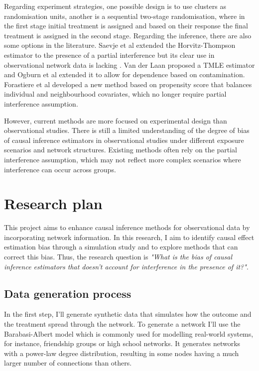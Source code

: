 \documentclass[a4paper,11pt]{article}
\begin{document}
Regarding experiment strategies, one possible design is to use clusters as randomisation units, another is a sequential two-stage randomisation, where in the first stage initial treatment is assigned and based on their response the final treatment is assigned in the second stage. Regarding the inference, there are also some options in the literature. Saevje et al extended the Horvitz-Thompson estimator to the presence of a partial interference but its clear use in observational network data is lacking \cite{savje2021average}. Van der Laan \cite{van2014causal} proposed a TMLE estimator and Ogburn et al \cite{ogburn2024causal} extended it to allow for dependence based on contamination. Forastiere et al \cite{forastiere2021identification} developed a new method based on propensity score that balances individual and neighbourhood covariates, which no longer require partial interference assumption.

However, current methods are more focused on experimental design than observational studies. There is still a limited understanding of the degree of bias of causal inference estimators in observational studies under different exposure scenarios and network structures. Existing methods often rely on the partial interference assumption, which may not reflect more complex scenarios where interference can occur across groups. 

\section{Research plan}
This project aims to enhance causal inference methods for observational data by incorporating network information. In this research, I aim to identify causal effect estimation bias through a simulation study and to explore methods that can correct this bias. Thus, the research question is \textit{"What is the bias of causal inference estimators that doesn't account for interference in the presence of it?"}. 

\subsection*{Data generation process}
In the first step, I'll generate synthetic data that simulates how the outcome and the treatment spread through the network. To generate a network I’ll use the Barabasi-Albert model which is commonly used for modelling real-world systems, for instance, friendship groups or high school networks. It generates networks with a power-law degree distribution, resulting in some nodes having a much larger number of connections than others. 
\end{document}
